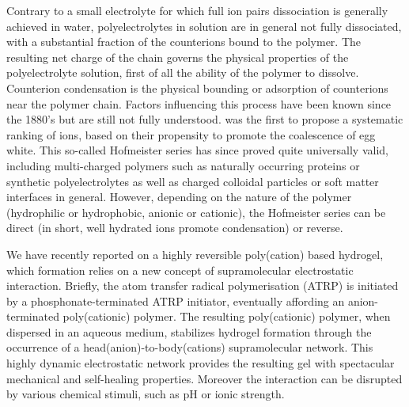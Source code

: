 \documentclass[journal=jacsat,manuscript=article]{achemso}
\begin{document}
Contrary to a small electrolyte for which full ion pairs dissociation is generally achieved in water, polyelectrolytes in solution are in general not fully dissociated, with a substantial fraction of the counterions bound to the polymer\cite{Manning1979}. The resulting net charge of the chain governs the physical properties of the polyelectrolyte solution\cite{Rubinstein1996}, first of all the ability of the polymer to dissolve. Counterion condensation is the physical bounding or adsorption of counterions near the polymer chain. Factors influencing this process have been known since the 1880's but are still not fully understood. \citet{Hofmeister1888} was the first to propose a systematic ranking of ions, based on their propensity to promote the coalescence of egg white. This so-called Hofmeister series has since proved quite universally valid\cite{Zhang2010a}, including multi-charged polymers such as naturally occurring proteins or synthetic polyelectrolytes as well as charged colloidal particles\cite{Schwierz2010,Oncsik2015} or soft matter interfaces in general\cite{Leontidis2014}. However, depending on the nature of the polymer (hydrophilic or hydrophobic, anionic or cationic), the Hofmeister series can be direct (in short, well hydrated ions promote condensation) or reverse\cite{Schwierz2010,Oncsik2015}.

We have recently reported on a highly reversible poly(cation) based hydrogel\cite{Srour2014}, which formation relies on a new concept of supramolecular  electrostatic interaction. Briefly, the atom transfer radical polymerisation (ATRP) is initiated by a phosphonate-terminated ATRP initiator, eventually affording an anion-terminated poly(cationic) polymer. The resulting poly(cationic) polymer, when dispersed in an aqueous medium, stabilizes hydrogel formation through the occurrence of a head(anion)-to-body(cations) supramolecular network. This highly dynamic electrostatic network provides the resulting gel with spectacular mechanical and self-healing properties. Moreover the interaction can be disrupted by various chemical stimuli, such as pH or ionic strength.
\end{document}
